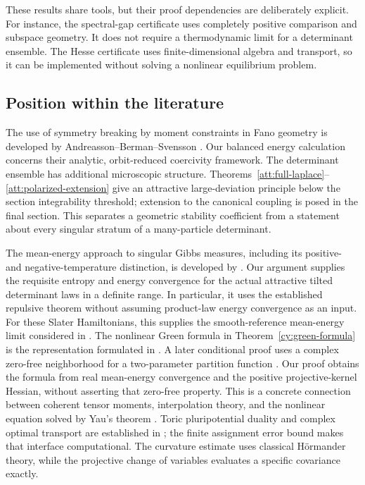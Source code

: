 These results share tools, but their proof dependencies are deliberately
explicit. For instance, the spectral-gap certificate uses completely positive
comparison and subspace geometry. It does not require a thermodynamic limit
for a determinant ensemble. The Hesse certificate uses finite-dimensional
algebra and transport, so it can be implemented without solving a nonlinear
equilibrium problem.

\subsection{Position within the literature}

The use of symmetry breaking by moment constraints in Fano geometry is
developed by Andreasson--Berman--Svensson \citep{AndreassonBermanSvensson2026}.
Our balanced energy calculation concerns their analytic, orbit-reduced
coercivity framework. The determinant ensemble has additional microscopic
structure. Theorems~\ref{att:full-laplace}--\ref{att:polarized-extension}
give an attractive large-deviation principle below the section integrability
threshold; extension to the canonical coupling is posed in the final
section. This separates a geometric stability coefficient from a statement
about every singular stratum of a many-particle determinant.

The mean-energy approach to singular Gibbs measures, including its
positive- and negative-temperature distinction, is developed by
\citet{Berman2018meanenergy}. Our argument supplies the requisite entropy
and energy convergence for the actual attractive tilted determinant laws
in a definite range. In particular, it uses the established repulsive
theorem without assuming product-law energy convergence as an input.
For these Slater Hamiltonians, this supplies the smooth-reference
mean-energy limit considered in \citet[Problem 4.10]{prob_berman2017}.
The nonlinear Green formula in Theorem~\ref{cy:green-formula} is the
representation formulated in \citet[Conjecture 6.1]{prob_berman2017}.
A later conditional proof uses a complex zero-free neighborhood for a
two-parameter partition function
\citep[Theorems 3.2--3.3]{Berman2023zeta}. Our proof obtains the formula
from real mean-energy convergence and the positive projective-kernel
Hessian, without asserting that zero-free property. This is a concrete
connection between coherent tensor moments, interpolation theory, and
the nonlinear equation solved by Yau's theorem \citep{Yau1978}.
Toric pluripotential duality and complex optimal transport are established
in \citet{BermanWittNystrom2014}; the finite assignment error bound makes
that interface computational. The curvature estimate uses classical
H\"ormander theory, while the projective change of variables evaluates a
specific covariance exactly.

